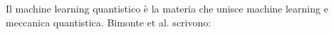 
Il machine learning quantistico è la materia che unisce machine learning e 
meccanica quantistica. Bimonte et al. \cite{Biamonte2017} scrivono: 
